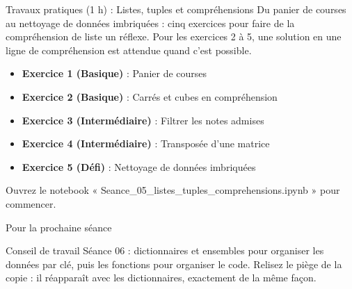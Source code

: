 \documentclass[aspectratio=169,11pt]{beamer}
\begin{document}
\begin{frame}{Travaux pratiques (1 h) : Listes, tuples et compréhensions}
Du panier de courses au nettoyage de données imbriquées : cinq exercices pour faire de la compréhension de liste un réflexe. Pour les exercices 2 à 5, une solution en une ligne de compréhension est attendue quand c'est possible.

\begin{itemize}
  \setlength{\itemsep}{1.5pt}\setlength{\parskip}{0pt}
  \item \textbf{Exercice 1 (Basique)} : Panier de courses
  \item \textbf{Exercice 2 (Basique)} : Carrés et cubes en compréhension
  \item \textbf{Exercice 3 (Intermédiaire)} : Filtrer les notes admises
  \item \textbf{Exercice 4 (Intermédiaire)} : Transposée d'une matrice
  \item \textbf{Exercice 5 (Défi)} : Nettoyage de données imbriquées
\end{itemize}
\vspace{4pt}

{\small\color{PyGris}Ouvrez le notebook « Seance\_05\_listes\_tuples\_comprehensions.ipynb » pour commencer.}
\end{frame}
\begin{frame}{Pour la prochaine séance}
\begin{exampleblock}{Conseil de travail}
Séance 06 : dictionnaires et ensembles pour organiser les données par clé, puis les fonctions pour organiser le code. Relisez le piège de la copie : il réapparaît avec les dictionnaires, exactement de la même façon.
\end{exampleblock}
\end{frame}
\end{document}
